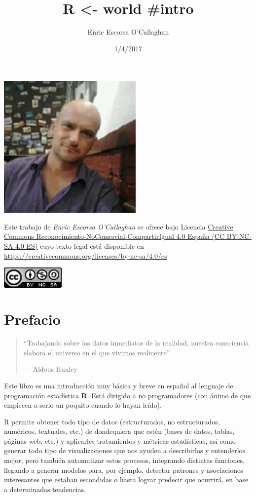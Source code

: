 \documentclass[]{book}
\title{R \textless{}- world \#intro}
\author{Enric Escorsa O'Callaghan}
\date{1/4/2017}
\theoremstyle{definition}
\theoremstyle{definition}
\theoremstyle{remark}
\begin{document}
\maketitle

{
\setcounter{tocdepth}{1}
\tableofcontents
}
\includegraphics[width=2.78in]{fotoenric2}

Este trabajo de \emph{Enric Escorsa O'Callaghan} se ofrece bajo Licencia
\href{https://creativecommons.org/licenses/by-nc-sa/4.0/es/}{Creative
Commons Reconocimiento-NoComercial-CompartirIgual 4.0 España (CC
BY-NC-SA 4.0 ES)} cuyo texto legal está disponible en
\url{https://creativecommons.org/licenses/by-nc-sa/4.0/es}

\includegraphics[width=1.22in]{cc}

\chapter{Prefacio}\label{prefacio}

\begin{quote}
``Trabajando sobre los datos inmediatos de la realidad, nuestra
consciencia elabora el universo en el que vivimos realmente''

--- Aldous Huxley
\end{quote}

Este libro es una introducción muy básica y breve en español al lenguaje
de programación estadística \textbf{R}. Está dirigido a no programadores
(con ánimo de que empiecen a serlo un poquito cuando lo hayan leído).

R permite obtener todo tipo de datos (estructurados, no estructurados,
numéricos, textuales, etc.) de dondequiera que estén (bases de datos,
tablas, páginas web, etc.) y aplicarles tratamientos y métricas
estadísticas, así como generar todo tipo de visualizaciones que nos
ayuden a describirlos y entenderlos mejor; pero también automatizar
estos procesos, integrando distintas funciones, llegando a generar
modelos para, por ejemplo, detectar patrones y asociaciones interesantes
que estaban escondidas o hasta lograr predecir que ocurrirá, en base a
determinadas tendencias.
\end{document}
